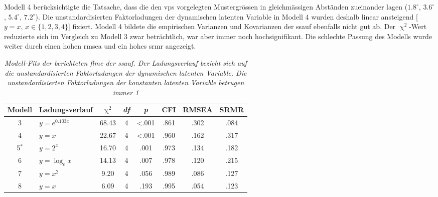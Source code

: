 \documentclass[11pt, twoside, a4paper]{book}		%
\begin{document}
Modell 4 berücksichtigte die Tatsache, dass die den \glspl{vp} vorgelegten Mustergrössen in gleichmässigen Abständen zueinander lagen ($1.8^{\circ}$, $3.6^{\circ}$, $5.4^{\circ}$, $7.2^{\circ}$).
Die unstandardisierten Faktorladungen der dynamischen latenten Variable in Modell 4 wurden deshalb linear ansteigend [$y=x,\,x\in\{1, 2, 3, 4\}$] fixiert. Modell 4 bildete die empirischen Varianzen und Kovarianzen der \gls{ssauf} ebenfalls nicht gut ab. Der $\upchi^2$-Wert reduzierte sich im Vergleich zu Modell 3 zwar beträchtlich, war aber immer noch hochsignifikant. Die schlechte Passung des Modells wurde weiter durch einen hohen \gls{rmsea} und ein hohes \gls{srmr} angezeigt.


\begin{table}[ht]
	\centering
	\captionsetup{labelsep = none}
	\caption[Modell-Fits der berichteten \gls{flm}e der \gls{ssauf}]{\newline  \textit{Modell-Fits der berichteten \gls{flm}e der \gls{ssauf}. Der Ladungsverlauf bezieht sich auf die unstandardisierten Faktorladungen der dynamischen latenten Variable. Die unstandardisierten Faktorladungen der konstanten latenten Variable betrugen immer 1} \vspace{.2cm}}
	\label{tab:fixed-links_measurement_models_spatial_suppression}
	\begin{adjustbox}{width=1\textwidth}
		\begin{threeparttable}
			\begin{tabular}{
					S[table-format = 1.0]
					l
					S[table-format = 2.2]
					S[table-format = 1.0]
					S[table-format = <0.3, add-integer-zero=false]
					S[table-format = 0.3, add-integer-zero=false]
					S[table-format = 0.3, add-integer-zero=false]
					S[table-format = 0.3, add-integer-zero=false]
				}
				\hline
				{Modell}	& Ladungsverlauf	& 	{$\upchi^2$}	& \textit{df}	& {\textit{p}}	&	{CFI} 	&	{RMSEA}	&	{SRMR}	\\
							&	$y=e^{0.103x}$	&	68.43			&	4			&	<.001		&	.861	&	.302	&	.084	\\
				4			&	$y=x$			&	22.67			&	4			&	<.001		&	.960	&	.162	&	.317	\\
				5{$^*$}		&	$y=2^x$			&	16.70			&	4			&	.001		&	.973	&	.134	&	.182	\\
				6			&	$y=\log_e x$	&	14.13			&	4			&	.007		&	.978	&	.120	&	.215	\\
				7			&	$y=x^2$			&	9.20			&	4			&	.056		&	.989	&	.086	&	.127	\\
				8			&	$y=x$			&	6.09			&	4			&	.193		&	.995	&	.054	&	.123	\\
				\hline
			\end{tabular}
	

\end{threeparttable}
\end{adjustbox}
\end{table}
\end{document}
